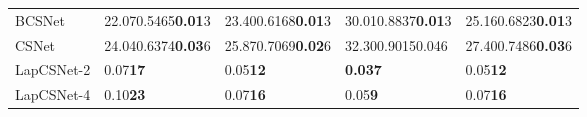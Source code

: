 \documentclass{article}
\begin{document}
\begin{table*}[!t]
\begin{small}
\begin{tabular}{>{\hfil}p{55pt}<{\hfil}|>{\hfil}p{98pt}<{\hfil}|>{\hfil}p{98pt}<{\hfil}|
    >{\hfil}p{98pt}<{\hfil}|>{\hfil}p{98pt}<{\hfil}}
BCSNet~\cite{adler2016deep}            & 22.070.5465\textbf{\color{red}0.01}3	&	23.400.6168\textbf{\color{red}0.01}3	& 30.010.8837\textbf{\color{red}0.01}3    &  25.160.6823\textbf{\color{red}0.01}3  	  \\


    CSNet~\cite{shi2017deep}             & 24.040.6374\textbf{\color{blue}0.03}6	&	25.870.7069\textbf{\color{blue}0.02}6	& 32.300.90150.046    &  27.400.7486\textbf{\color{blue}0.03}6  	  \\
LapCSNet-2           & 0.07\textbf{\color{blue}17}    &   0.05\textbf{\color{blue}12}  & \textbf{\color{blue}0.03}\textbf{\color{blue}7}    &  0.05\textbf{\color{blue}12}     \\

LapCSNet-4           &   0.10\textbf{\color{red}23}  &  0.07\textbf{\color{red}16}   & 0.05\textbf{\color{red}9}    &  0.07\textbf{\color{red}16}     \\

    \hline
    \end{tabular}
    \end{small}
\end{table*}
\end{document}
